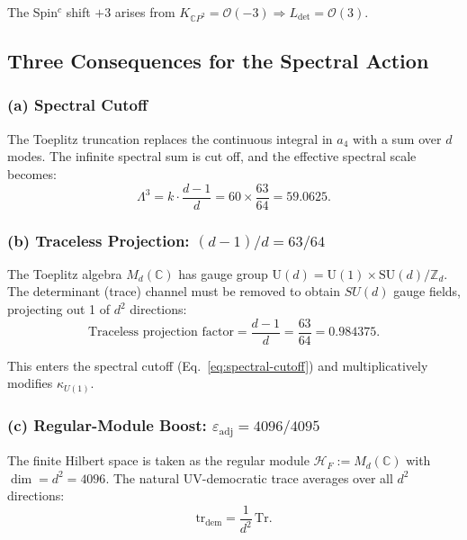 \documentclass[12pt,a4paper]{article}
\begin{document}
The Spin$^c$ shift $+3$ arises from $K_{\mathbb{C}P^2} = \mathcal{O}(-3)
\Rightarrow L_{\det} = \mathcal{O}(3)$.

\subsection{Three Consequences for the Spectral Action}

\subsubsection{(a) Spectral Cutoff}

The Toeplitz truncation replaces the continuous integral in $a_4$ with a
sum over $d$ modes.  The infinite spectral sum is cut off, and the effective
spectral scale becomes:
\begin{equation}\label{eq:spectral-cutoff}
\Lambda^3 = k \cdot \frac{d-1}{d} = 60 \times \frac{63}{64} = 59.0625.
\end{equation}

\subsubsection{(b) Traceless Projection: $(d-1)/d = 63/64$}

The Toeplitz algebra $M_d(\mathbb{C})$ has gauge group
$\mathrm{U}(d) = \mathrm{U}(1) \times \mathrm{SU}(d)/\mathbb{Z}_d$.
The determinant (trace) channel must be removed to obtain $SU(d)$
gauge fields, projecting out 1 of $d^2$ directions:
\begin{equation}\label{eq:traceless}
\text{Traceless projection factor} = \frac{d-1}{d} = \frac{63}{64} = 0.984375.
\end{equation}

This enters the spectral cutoff (Eq.~\ref{eq:spectral-cutoff}) and
multiplicatively modifies $\kappa_{U(1)}$.

\subsubsection{(c) Regular-Module Boost: $\varepsilon_{\mathrm{adj}} = 4096/4095$}

The finite Hilbert space is taken as the regular module
$\mathcal{H}_F := M_d(\mathbb{C})$ with $\dim = d^2 = 4096$.  The natural
UV-democratic trace averages over all $d^2$ directions:
\begin{equation}
\mathrm{tr}_{\mathrm{dem}} = \frac{1}{d^2}\,\mathrm{Tr}.
\end{equation}
\end{document}
